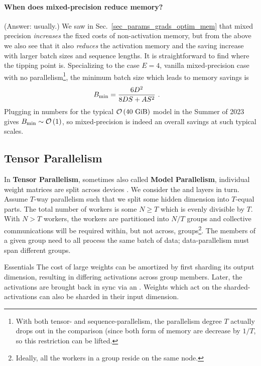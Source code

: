 \documentclass[11pt]{article}
\begin{document}
\paragraph{When does mixed-precision reduce memory?} (Answer: usually.) We saw in Sec.~\ref{sec_params_grads_optim_mem}
that mixed precision \textit{increases} the fixed costs of non-activation memory, but from the above
we also see that it also \textit{reduces} the activation memory and the saving increase with larger
batch sizes and sequence lengths. It is straightforward to find where the tipping point is.
Specializing to the case $E=4$, vanilla mixed-precision case with no parallelism\footnote{With both
	tensor- and sequence-parallelism, the parallelism degree $ T $ actually drops out in the comparison
	(since both form of memory are decrease by $ 1/T $, so this restriction  can be lifted.}, the
minimum batch size which leads to memory savings is
\begin{align}
	B _{ {\rm min}  } & = \frac{ 6 D ^{ 2 } }{ 8 DS + A S ^{ 2 } }\label{eq_min_mp_batch_size}\ .
\end{align}
Plugging in numbers for the typical $ \mathcal{O} \left( 40 \ {\rm GiB} \right)$ model in the Summer of
2023 gives $ B _{ {\rm min} } \sim \mathcal{O} \left( 1\right)  $, so mixed-precision is indeed an overall
savings at such typical scales.


\subsection{Tensor Parallelism \label{subsec_tensor_parallelism} }


In \textbf{Tensor Parallelism}, sometimes also called \textbf{Model Parallelism}, individual weight
matrices are split across devices \cite{shoeybi2020megatronlm}. We consider the  and
 layers in turn. Assume $ T $-way parallelism such that we split some
hidden dimension into $ T $-equal parts. The total number of workers is some $ N \ge T $ which is
evenly divisible by $ T $. With $ N >T $ workers, the workers are partitioned into $ N/T $ groups
and collective communications will be required within, but not across, groups\footnote{Ideally, all
	the workers in a group reside on the same node.}. The members of a given group need to all process
the same batch of data; data-parallelism must span different groups.


\begin{nicebox}{Essentials}
	The cost of large weights can be amortized by first sharding its output dimension, resulting in
	differing activations across group members. Later, the activations are brought back in sync via
	an . Weights which act on the sharded-activations can also be sharded in their
	input dimension.
\end{nicebox}
\end{document}

